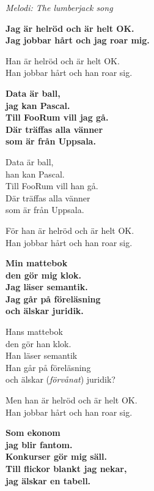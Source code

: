 {\footnotesize\textit{Melodi: The lumberjack song}}\par
\vspace{10pt}
\textbf{Jag är helröd och är helt OK.\\
Jag jobbar hårt och jag roar mig.}\par
\vspace{10pt}
Han är helröd och är helt OK.\\
Han jobbar hårt och han roar sig.\par
\vspace{10pt}
\textbf{Data är ball,\\
jag kan Pascal.\\
Till FooRum vill jag gå.\\
Där träffas alla vänner\\
som är från Uppsala.}\par
\vspace{10pt}
Data är ball,\\
han kan Pascal.\\
Till FooRum vill han gå.\\
Där träffas alla vänner\\
som är från Uppsala.\par
\vspace{10pt}
För han är helröd och är helt OK.\\
Han jobbar hårt och han roar sig.\par
\vspace{10pt}
\textbf{Min mattebok\\
den gör mig klok.\\
Jag läser semantik.\\
Jag går på föreläsning\\
och älskar juridik.}\par
\newpage
Hans mattebok\\
den gör han klok.\\
Han läser semantik\\
Han går på föreläsning\\
och älskar (\textit{förvånat}) juridik?\par
\vspace{10pt}
Men han är helröd och är helt OK.\\
Han jobbar hårt och han roar sig.\par
\vspace{10pt}
\textbf{Som ekonom\\
jag blir fantom.\\
Konkurser gör mig säll.\\
Till flickor blankt jag nekar,\\
jag älskar en tabell.}\par
